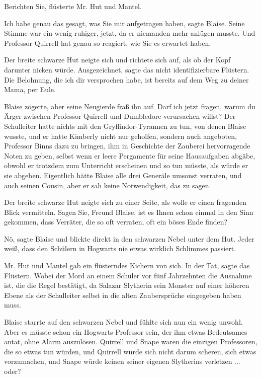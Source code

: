 \glqq{}Berichten Sie\grqq{}, flüsterte Mr. Hut und Mantel.

\glqq{}Ich habe genau das gesagt, was Sie mir aufgetragen haben\grqq{}, sagte
Blaise. Seine Stimme war ein wenig ruhiger, jetzt, da er niemanden mehr anlügen
musste. \glqq{}Und Professor Quirrell hat genau so reagiert, wie Sie es erwartet
haben.\grqq{}

Der breite schwarze Hut neigte sich und richtete sich auf, als ob der Kopf
darunter nicken würde. \glqq{}Ausgezeichnet\grqq{}, sagte das nicht
identifizierbare Flüstern. \glqq{}Die Belohnung, die ich dir versprochen habe,
ist bereits auf dem Weg zu deiner Mama, per Eule.\grqq{}

Blaise zögerte, aber seine Neugierde fraß ihn auf. \glqq{}Darf ich jetzt fragen,
warum du Ärger zwischen Professor Quirrell und Dumbledore verursachen willst?\grqq{}
Der Schulleiter hatte nichts mit den Gryffindor-Tyrannen zu tun, von denen
Blaise wusste, und er hatte Kimberly nicht nur geholfen, sondern auch angeboten,
Professor Binns dazu zu bringen, ihm in Geschichte der Zauberei hervorragende
Noten zu geben, selbst wenn er leere Pergamente für seine Hausaufgaben abgäbe,
obwohl er trotzdem zum Unterricht erscheinen und so tun müsste, als würde er sie
abgeben. Eigentlich hätte Blaise alle drei Generäle umsonst verraten, und auch
seinen Cousin, aber er sah keine Notwendigkeit, das zu sagen.

Der breite schwarze Hut neigte sich zu einer Seite, als wolle er einen fragenden
Blick vermitteln. \glqq{}Sagen Sie, Freund Blaise, ist es Ihnen schon einmal in
den Sinn gekommen, dass Verräter, die so oft verraten, oft ein böses Ende
finden?\grqq{}

\glqq{}Nö\grqq{}, sagte Blaise und blickte direkt in den schwarzen Nebel unter
dem Hut. \glqq{}Jeder weiß, dass den Schülern in Hogwarts nie etwas wirklich
Schlimmes passiert.\grqq{}

Mr. Hut und Mantel gab ein flüsterndes Kichern von sich. \glqq{}In der
Tat\grqq{}, sagte das Flüstern. \glqq{}Wobei der Mord an einem Schüler vor fünf
Jahrzehnten die Ausnahme ist, die die Regel bestätigt, da Salazar Slytherin sein
Monster auf einer höheren Ebene als der Schulleiter selbst in die alten
Zaubersprüche eingegeben haben muss.\grqq{}

Blaise starrte auf den schwarzen Nebel und fühlte sich nun ein wenig unwohl.
Aber es müsste schon ein Hogwarts-Professor sein, der ihm etwas Bedeutsames
antat, ohne Alarm auszulösen. Quirrell und Snape waren die einzigen Professoren,
die so etwas tun würden, und Quirrell würde sich nicht darum scheren, sich etwas
vorzumachen, und Snape würde keinen seiner eigenen Slytherins verletzen ...
oder?

